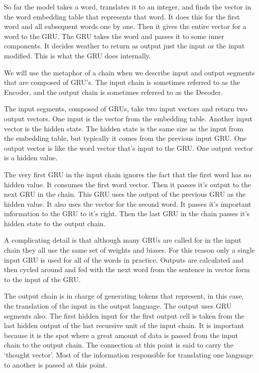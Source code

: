 So far the model takes a word, translates it to an integer, and finds the vector in the word embedding table that represents that word. It does this for the first word and all subsequent words one by one. Then it gives the entire vector for a word to the GRU. The GRU takes the word and passes it to some inner components. It decides weather to return as output just the input or the input modified. This is what the GRU does internally.

We will use the metaphor of a chain when we describe input and output segments that are composed of GRU's. The input chain is sometimes referred to as the Encoder, and the output chain is sometimes referred to as the Decoder.

The input segments, composed of GRUs, take two input vectors and return two output vectors. One input is the vector from the embedding table. Another input vector is the hidden state. The hidden state is the same size as the input from the embedding table, but typically it comes from the previous input GRU. One output vector is like the word vector that's input to the GRU. One output vector is a hidden value.



The very first GRU in the input chain ignores the fact that the first word has no hidden value. It consumes the first word vector. Then it passes it's output to the next GRU in the chain. This GRU uses the output of the previous GRU as the hidden value. It also uses the vector for the second word. It passes it's important information to the GRU to it's right. Then the last GRU in the chain passes it's hidden state to the output chain.



A complicating detail is that although many GRUs are called for in the input chain they all use the same set of weights and 
biases. For this reason only a single input GRU is used for all of the words in practice. Outputs are calculated and then cycled around and fed with the next word from the sentence in vector form to the input of the GRU. 


The output chain is in charge of generating tokens that represent, in this case, the translation of the input in the output language. The output uses GRU segments also. The first hidden input for the first output cell is taken from the 
last hidden output of the last recursive unit of the input chain. It is important because it is the spot where a great amount of data is passed from the input chain to the output chain. 
The connection at this point is said to carry the `thought vector'. Most of the information responsible for translating one language to another is passed at this point.

